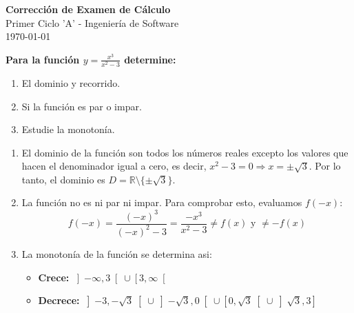 \documentclass[answers]{exam}
\begin{document}
\begin{center}
    \Large\textbf{Corrección de Examen de Cálculo}\\[1em]
    \large Primer Ciclo 'A' - Ingeniería de Software\\[1em]
    \large \today
\end{center}

\vspace{0.5cm}

\begin{questions}

\question \large\textbf{Para la función $\displaystyle y = \frac{x^3}{x^2 - 3} $ determine:}
\begin{enumerate}[label=\alph*.]
    \item El dominio y recorrido.
    \item Si la función es par o impar.
    \item Estudie la monotonía.
\end{enumerate}
\begin{solution}
\begin{enumerate}[label=\alph*.]
    \item El dominio de la función son todos los números reales excepto los valores que hacen el denominador igual a cero, es decir, $x^2 - 3 = 0 \Rightarrow x = \pm\sqrt{3}$. Por lo tanto, el dominio es $D = \mathbb{R} \setminus \{\pm\sqrt{3}\}$.
    
    \item La función no es ni par ni impar. Para comprobar esto, evaluamos $f(-x)$:
    \[
    f(-x) = \frac{(-x)^3}{(-x)^2 - 3} = \frac{-x^3}{x^2 - 3} \neq f(x) \text{ y } \neq -f(x)
    \]

    \item La monotonía de la función se determina asi:
    \begin{itemize}
      \item \normalsize\textbf{Crece:} $\displaystyle 
      \left]-\infty, 3\right[\cup \left[3, \infty\right[
      $
      \item \normalsize\textbf{Decrece:} $\displaystyle 
      \left]-3, -\sqrt{3}\right[\cup \left]-\sqrt{3}, 0\right[\cup \left[0, \sqrt{3}\right[\cup \left]\sqrt{3}, 3\right]
      $
    \end{itemize}
\end{enumerate}
\vspace{0.5cm}



\end{solution}
\end{questions}
\end{document}
